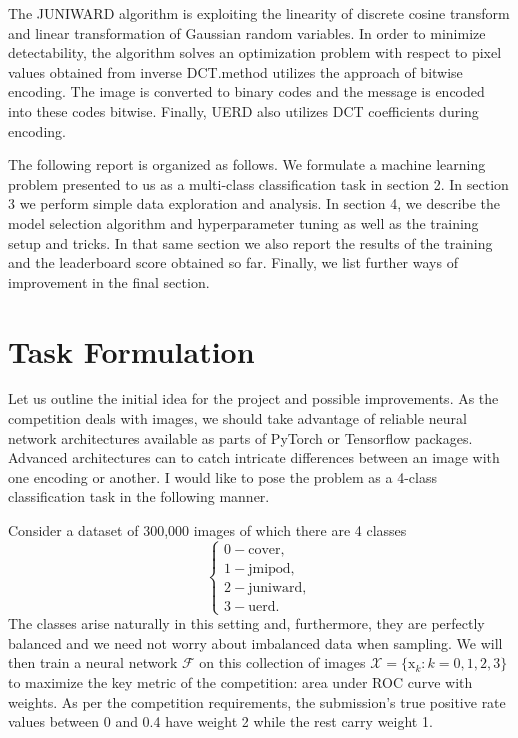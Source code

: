 \documentclass[letterpaper]{article}
\newcommand{\F}{\mathcal{F}}
\newcommand{\X}{\mathcal{X}}
\newcommand{\xvec}{\mathrm{x}}
\begin{document}
The JUNIWARD algorithm is exploiting the linearity of discrete cosine transform and linear transformation of Gaussian random variables. In order to minimize detectability, the algorithm solves an optimization problem with respect to pixel values obtained from inverse DCT.\@JMiPOD method utilizes the approach of bitwise encoding. The image is converted to binary codes and the message is encoded into these codes bitwise. Finally, UERD also utilizes DCT coefficients during encoding.

The following report is organized as follows. We formulate a machine learning problem presented to us as a multi-class classification task in section 2. In section 3 we perform simple data exploration and analysis. In section 4, we describe the model selection algorithm and hyperparameter tuning as well as the training setup and tricks. In that same section we also report the results of the training and the leaderboard score obtained so far. Finally, we list further ways of improvement in the final section.

\section{Task Formulation}

Let us outline the initial idea for the project and possible improvements. As the competition deals with images, we should take advantage of reliable neural network architectures available as parts of PyTorch or Tensorflow packages. Advanced architectures can to catch intricate differences between an image with one encoding or another. I would like to pose the problem as a 4-class classification task in the following manner.

Consider a dataset of 300,000 images of which there are 4 classes
\[ \begin{cases}
        0 -\text{cover},     \\
        1 - \text{jmipod},   \\
        2 - \text{juniward}, \\
        3 - \text{uerd}.
    \end{cases} \]
The classes arise naturally in this setting and, furthermore, they are perfectly balanced and we need not worry about imbalanced data when sampling.
We will then train a neural network \( \F \) on this collection of images \( \X = \{ \xvec_k: k=0,1,2,3 \} \) to maximize the key metric of the competition: area under ROC curve with weights. As per the competition requirements, the submission's true positive rate values between 0 and 0.4 have weight 2 while the rest carry weight 1.
\end{document}
